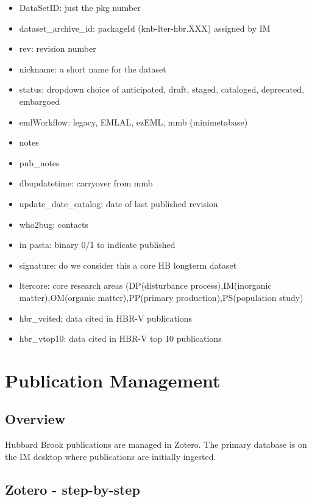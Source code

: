 \documentclass[
  letterpaper,
  DIV=11,
  numbers=noendperiod]{scrreprt}
\providecommand{\tightlist}{%
  \setlength{\itemsep}{0pt}\setlength{\parskip}{0pt}}\usepackage{longtable,booktabs,array}
\begin{document}
\begin{itemize}
\tightlist
\item
  DataSetID: just the pkg number
\item
  dataset\_archive\_id: packageId (knb-lter-hbr.XXX) assigned by IM
\item
  rev: revision number
\item
  nickname: a short name for the dataset
\item
  status: dropdown choice of anticipated, draft, staged, cataloged,
  deprecated, embargoed
\item
  emlWorkflow: legacy, EMLAL, ezEML, mmb (minimetabase)
\item
  notes
\item
  pub\_notes
\item
  dbupdatetime: carryover from mmb
\item
  update\_date\_catalog: date of last published revision
\item
  who2bug: contacts
\item
  in pasta: binary 0/1 to indicate published
\item
  signature: do we consider this a core HB longterm dataset
\item
  ltercore: core research areas (DP(disturbance process),IM(inorganic
  matter),OM(organic matter),PP(primary production),PS(population study)
\item
  hbr\_vcited: data cited in HBR-V publications
\item
  hbr\_vtop10: data cited in HBR-V top 10 publications
\end{itemize}


\chapter{Publication Management}\label{publication-management}

\section{Overview}\label{overview-3}

Hubbard Brook publications are managed in Zotero. The primary database
is on the IM desktop where publications are initially ingested.

\section{Zotero - step-by-step}\label{zotero---step-by-step}
\end{document}
